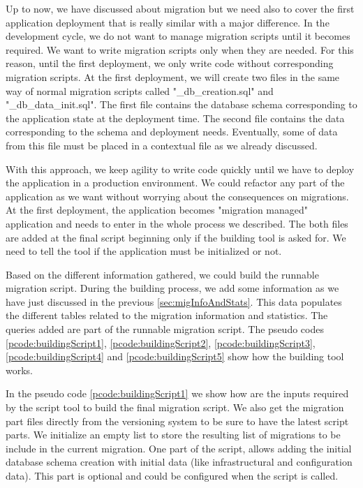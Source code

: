 Up to now, we have discussed about migration but we need also to cover the first application deployment that is really similar with a major difference. In the development cycle, we do not want to manage migration scripts until it becomes required. We want to write migration scripts only when they are needed. For this reason, until the first deployment, we only write code without corresponding migration scripts. At the first deployment, we will create two files in the same way of normal migration scripts called "\_db\_creation.sql" and "\_db\_data\_init.sql". The first file contains the database schema corresponding to the application state at the deployment time. The second file contains the data corresponding to the schema and deployment needs. Eventually, some of data from this file must be placed in a contextual file as we already discussed.

With this approach, we keep agility to write code quickly until we have to deploy the application in a production environment. We could refactor any part of the application as we want without worrying about the consequences on migrations. At the first deployment, the application becomes "migration managed" application and needs to enter in the whole process we described. The both files are added at the final script beginning only if the building tool is asked for. We need to tell the tool if the application must be initialized or not.

Based on the different information gathered, we could build the runnable migration script. During the building process, we add some information as we have just discussed in the previous \autoref{sec:migInfoAndStats}. This data populates the different tables related to the migration information and statistics. The queries added are part of the runnable migration script. The pseudo codes \ref{pcode:buildingScript1}, \ref{pcode:buildingScript2}, \ref{pcode:buildingScript3}, \ref{pcode:buildingScript4} and \ref{pcode:buildingScript5} show how the building tool works.

In the pseudo code \ref{pcode:buildingScript1} we show how are the inputs required by the script tool to build the final migration script. We also get the migration part files directly from the versioning system to be sure to have the latest script parts. We initialize an empty list to store the resulting list of migrations to be include in the current migration. One part of the script, allows adding the initial database schema creation with initial data (like infrastructural and configuration data). This part is optional and could be configured when the script is called. 

